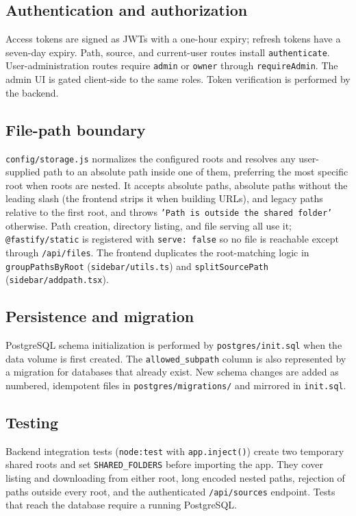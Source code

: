\documentclass[10pt]{article}
\begin{document}
\subsection{Authentication and authorization}
Access tokens are signed as JWTs with a one-hour expiry; refresh tokens have a seven-day
expiry. Path, source, and current-user routes install \texttt{authenticate}. User-administration
routes require \texttt{admin} or \texttt{owner} through \texttt{requireAdmin}. The admin UI is
gated client-side to the same roles. Token verification is performed by the backend.

\subsection{File-path boundary}
\texttt{config/storage.js} normalizes the configured roots and resolves any user-supplied path to
an absolute path inside one of them, preferring the most specific root when roots are nested.
It accepts absolute paths, absolute paths without the leading slash (the frontend strips it when
building URLs), and legacy paths relative to the first root, and throws
\texttt{'Path is outside the shared folder'} otherwise. Path creation, directory listing, and file
serving all use it; \texttt{@fastify/static} is registered with \texttt{serve: false} so no file is
reachable except through \texttt{/api/files}. The frontend duplicates the root-matching logic in
\texttt{groupPathsByRoot} (\texttt{sidebar/utils.ts}) and \texttt{splitSourcePath}
(\texttt{sidebar/addpath.tsx}).

\subsection{Persistence and migration}
PostgreSQL schema initialization is performed by \texttt{postgres/init.sql} when the data
volume is first created. The \texttt{allowed\_subpath} column is also represented by a migration
for databases that already exist. New schema changes are added as numbered, idempotent files in
\texttt{postgres/migrations/} and mirrored in \texttt{init.sql}.

\subsection{Testing}
Backend integration tests (\texttt{node:test} with \texttt{app.inject()}) create two temporary
shared roots and set \texttt{SHARED\_FOLDERS} before importing the app. They cover listing and
downloading from either root, long encoded nested paths, rejection of paths outside every root,
and the authenticated \texttt{/api/sources} endpoint. Tests that reach the database require a
running PostgreSQL.
\end{document}
